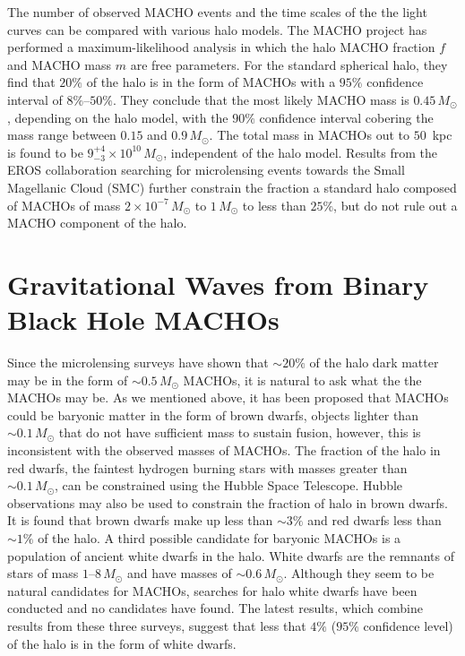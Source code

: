 The number of observed MACHO events and the time scales of the the light
curves can be compared with various halo models. The MACHO project has
performed a maximum-likelihood analysis in which the halo MACHO fraction $f$
and MACHO mass $m$ are free parameters. For the standard spherical halo, they
find that $20\%$ of the halo is in the form of MACHOs with a $95\%$ confidence
interval of $8\%$--$50\%$. They conclude that the most likely MACHO mass is
$0.45\,M_\odot$, depending on the halo model, with the $90\%$ confidence
interval cobering the mass range between $0.15$ and $0.9\,M_\odot$. The total
mass in MACHOs out to $50$~kpc is found to be $9_{-3}^{+4} \times
10^{10}\,M_\odot$, independent of the halo model\cite{Alcock:2000ph}. Results
from the EROS collaboration\cite{Afonso:2002xq} searching for microlensing
events towards the Small Magellanic Cloud (SMC) further constrain the fraction
a standard halo composed of MACHOs of mass $2 \times 10^{-7}\,M_\odot$ to $1\,
M_\odot$ to less than $25\%$, but do not rule out a MACHO component of the
halo.

\section{Gravitational Waves from Binary Black Hole MACHOs}
\label{s:bbhmacho}

Since the microlensing surveys have shown that $\sim 20\%$ of the halo dark
matter may be in the form of $\sim 0.5\,M_\odot$ MACHOs, it is natural to ask
what the the MACHOs may be. As we mentioned above, it has been proposed that
MACHOs could be baryonic matter in the form of brown dwarfs, objects lighter
than $\sim 0.1\,M_\odot$ that do not have sufficient mass to sustain fusion,
however, this is inconsistent with the observed masses of MACHOs. The fraction
of the halo in red dwarfs, the faintest hydrogen burning stars with masses
greater than $\sim 0.1\,M_\odot$, can be constrained using the Hubble Space
Telescope. Hubble observations may also be used to constrain the fraction of
halo in brown dwarfs. It is found that brown dwarfs make up less than $\sim
3\%$ and red dwarfs less than $\sim 1\%$ of the
halo\cite{Graff:1995ru,Graff:1996rz}.  A third possible candidate for baryonic
MACHOs is a population of ancient white dwarfs in the halo. White dwarfs are
the remnants of stars of mass $1$--$8\,M_\odot$ and have masses of $\sim
0.6\,M_\odot$. Although they seem to be natural candidates for MACHOs,
searches for halo white dwarfs have been conducted and no candidates have
found\cite{2002A&A...389L..69G,2002ApJ...573..644N,Creze:2004gs}. The latest
results, which combine results from these three surveys, suggest that less
that $4\%$ ($95\%$ confidence level) of the halo is in the form of white
dwarfs\cite{Creze:2004gs}. 

